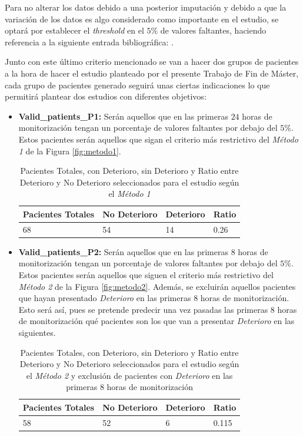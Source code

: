 Para no alterar los datos debido a una posterior imputación y debido a que la variación de los datos es algo considerado como importante en el estudio, se optará por establecer el \textit{threshold} en el $5 \%$ de valores faltantes, haciendo referencia a la siguiente entrada bibliográfica: \cite{Scheffer2002}. 

Junto con este último criterio mencionado se van a hacer dos grupos de pacientes a la hora de hacer el estudio planteado por el presente Trabajo de Fin de Máster, cada grupo de pacientes generado seguirá unas ciertas indicaciones lo que permitirá plantear dos estudios con diferentes objetivos:

\begin{itemize}
    \item \textbf{Valid\_patients\_P1:} Serán aquellos que en las primeras $24$ horas de monitorización tengan un porcentaje de valores faltantes por debajo del $5\%$. Estos pacientes serán aquellos que sigan el criterio más restrictivo del \textit{Método 1} de la Figura \ref{fig:metodo1}. 
    \begin{table}[H]
        \centering
        \begin{tabular}{|m{2cm}|m{2.25cm}|m{2cm}|m{2cm}|}
        \hline
            Pacientes Totales & No Deterioro & Deterioro & Ratio \\ \hline
            68 & 54 & 14 & 0.26 \\ \hline
        \end{tabular}
        \caption{Pacientes Totales, con Deterioro, sin Deterioro y Ratio entre Deterioro y No Deterioro seleccionados para el estudio según el \textit{Método 1}}\label{tabla:ratio-deterioro-P1}
    \end{table}
    \item \textbf{Valid\_patients\_P2:} Serán aquellos que en las primeras $8$ horas de monitorización tengan un porcentaje de valores faltantes por debajo del $5\%$. Estos pacientes serán aquellos que siguen el criterio más restrictivo del \textit{Método 2} de la Figura \ref{fig:metodo2}. Además, se excluirán aquellos pacientes que hayan presentado \textit{Deterioro} en las primeras $8$ horas de monitorización. Esto será así, pues se pretende predecir una vez pasadas las primeras $8$ horas de monitorización qué pacientes son los que van a presentar \textit{Deterioro} en las siguientes.
    \begin{table}[H]
        \centering
        \begin{tabular}{|m{2cm}|m{2.25cm}|m{2cm}|m{2cm}|}
        \hline
            Pacientes Totales & No Deterioro & Deterioro & Ratio \\ \hline
            58 & 52 & 6 & 0.115 \\ \hline
        \end{tabular}
        \caption{Pacientes Totales, con Deterioro, sin Deterioro y Ratio entre Deterioro y No Deterioro seleccionados para el estudio según el \textit{Método 2} y exclusión de pacientes con \textit{Deterioro} en las primeras 8 horas de monitorización}
            \label{tabla:ratio-deterioro-P1}
    \end{table}
\end{itemize}

